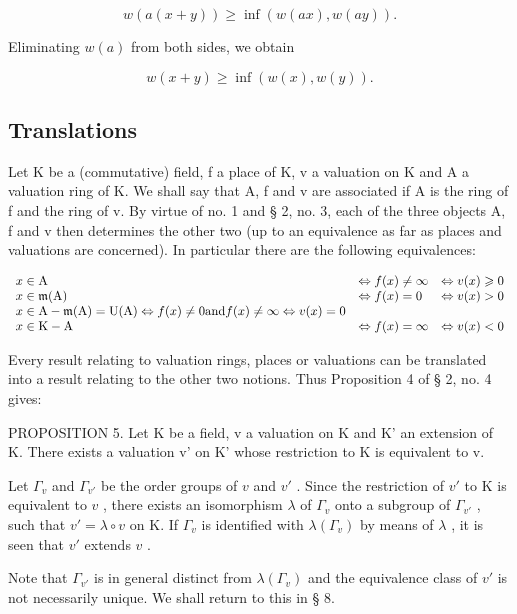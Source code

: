 \[
w (a (x + y)) \geqslant \inf (w (a x), w (a y)).
\]

Eliminating \(w(a)\) from both sides, we obtain

\[
w (x + y) \geqslant \inf (w (x), w (y)).
\]

\subsection{Translations}

Let K be a (commutative) field, f a place of K, v a valuation on K and A a valuation ring of K. We shall say that A, f and v are associated if A is the ring of f and the ring of v. By virtue of no. 1 and § 2, no. 3, each of the three objects A, f and v then determines the other two (up to an equivalence as far as places and valuations are concerned). In particular there are the following equivalences:

\[
\begin{array}{l l l l} x \in \mathrm{A} & \Leftrightarrow f (x) \neq \infty & \Leftrightarrow v (x) \geqslant 0 \\ x \in \mathfrak {m} (\mathrm{A}) & \Leftrightarrow f (x) = 0 & \Leftrightarrow v (x) > 0 \\ x \in \mathrm{A} - \mathfrak {m} (\mathrm{A}) = \mathrm{U} (\mathrm{A}) \Leftrightarrow f (x) \neq 0 \text {and} f (x) \neq \infty \Leftrightarrow v (x) = 0 \\ x \in \mathrm{K} - \mathrm{A} & \Leftrightarrow f (x) = \infty & \Leftrightarrow v (x) <   0 \end{array}
\]

Every result relating to valuation rings, places or valuations can be translated into a result relating to the other two notions. Thus Proposition 4 of § 2, no. 4 gives:

PROPOSITION 5. Let K be a field, v a valuation on K and K' an extension of K. There exists a valuation v' on K' whose restriction to K is equivalent to v.

Let \(\Gamma_v\) and \(\Gamma_{v'}\) be the order groups of \(v\) and \(v'\) . Since the restriction of \(v'\) to K is equivalent to \(v\) , there exists an isomorphism \(\lambda\) of \(\Gamma_v\) onto a subgroup of \(\Gamma_{v'}\) , such that \(v' = \lambda \circ v\) on K. If \(\Gamma_v\) is identified with \(\lambda(\Gamma_v)\) by means of \(\lambda\) , it is seen that \(v'\) extends \(v\) .

Note that \(\Gamma_{v'}\) is in general distinct from \(\lambda(\Gamma_v)\) and the equivalence class of \(v'\) is not necessarily unique. We shall return to this in § 8.


